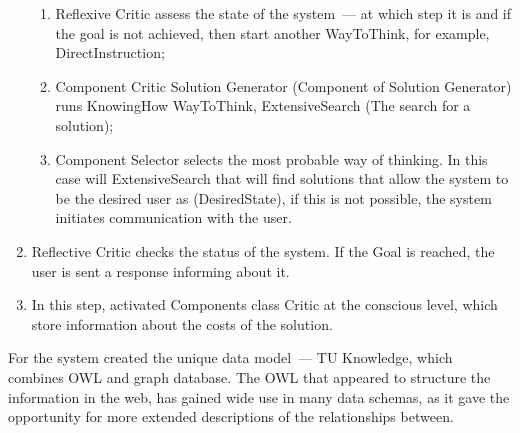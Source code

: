 \begin{enumerate}
\begin{enumerate}
	\item Reflexive Critic assess the state of the system~--- at which step it is and if the goal is not achieved, then start another WayToThink, for example, DirectInstruction;
	\item Component Critic Solution Generator (Component of Solution Generator) runs KnowingHow WayToThink, ExtensiveSearch (The search for a solution);
	\item Component Selector selects the most probable way of thinking. In this case will ExtensiveSearch that will find solutions that allow the system to be the desired user as (DesiredState), if this is not possible, the system initiates communication with the user. 
 \end{enumerate}
	 \item Reflective Critic checks the status of the system. If the Goal is reached, the user is sent a response informing about it.
	 \item In this step, activated Components class Critic at the conscious level, which store information about the costs of the solution.
  \end{enumerate}\par
For the system created the unique data model~--- TU Knowledge, which combines OWL and graph database. The OWL that appeared to structure the information in the web, has gained wide use in many data schemas, as it gave the opportunity for more extended descriptions of the relationships between. 

